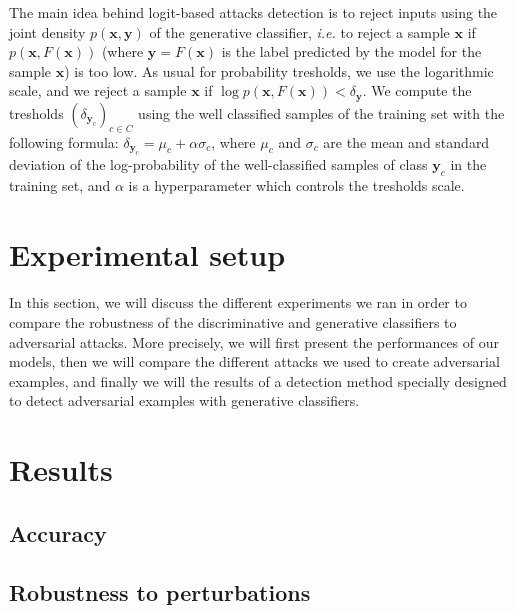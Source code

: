 \documentclass[11pt,twocolumn,letterpaper]{article}
\begin{document}
The main idea behind logit-based attacks detection is to reject inputs using the joint density $p(\bm{x}, \bm{y})$ of the generative classifier, \textit{i.e.} to reject a sample $\bm{x}$ if $p(\bm{x}, F(\bm{x}))$ (where $\bm{y} = F(\bm{x})$ is the label predicted by the model for the sample $\bm{x}$) is too low. As usual for probability tresholds, we use the logarithmic scale, and we reject a sample $\bm{x}$ if $\log{p(\bm{x}, F(\bm{x}))} < \delta_{\bm{y}}$. We compute the tresholds $(\delta_{\bm{y}_c})_{c \in C}$ using the well classified samples of the training set with the following formula: $\delta_{\bm{y}_c} = \mu_c + \alpha \sigma_c$, where $\mu_c$ and $\sigma_c$ are the mean and standard deviation of the log-probability of the well-classified samples of class $\bm{y}_c$ in the training set, and $\alpha$ is a hyperparameter which controls the tresholds scale.

\section{Experimental setup}
\label{sec:setup}

\paragraph{} In this section, we will discuss the different experiments we ran in order to compare the robustness of the discriminative and generative classifiers to adversarial attacks. More precisely, we will first present the performances of our models, then we will compare the different attacks we used to create adversarial examples, and finally we will the results of a detection method specially designed to detect adversarial examples with generative classifiers.


\section{Results}
\label{sec:results}

\subsection{Accuracy}

\paragraph{} 

\subsection{Robustness to perturbations}
\end{document}
